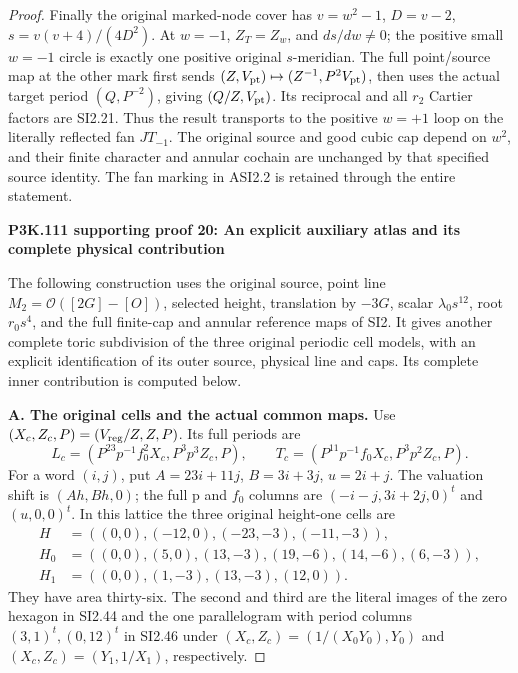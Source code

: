 \begin{proof}
Finally the original marked-node
cover has \(v=w^2-1\),
\(D=v-2\), \(s=v(v+4)/(4D^2)\).
At \(w=-1\), \(Z_T=Z_w\), and
\(ds/dw\ne0\); the positive small
\(w=-1\) circle is exactly one
positive original \(s\)-meridian.
The full point/source map at the
other mark first sends
\((Z,V_{\rm pt})\mapsto(Z^{-1},P^2V_{\rm pt})\),
then uses the actual target period
\((Q,P^{-2})\), giving
\((Q/Z,V_{\rm pt})\).
Its reciprocal and all \(r_2\)
Cartier factors are SI2.21.
Thus the result transports to the
positive \(w=+1\) loop on the
literally reflected fan \(JT_{-1}\).
The original source and good cubic
cap depend on \(w^2\), and their
finite character and annular
cochain are unchanged by that
specified source identity. The
fan marking in ASI2.2 is retained
through the entire statement.



\par\bigskip\noindent\textbf{P3K.111 supporting proof 20: An explicit auxiliary atlas and its complete physical contribution}\par\nobreak

The following construction uses the original source, point line
\(M_2=\mathcal O([2G]-[O])\), selected height, translation by \(-3G\),
scalar \(\lambda_0s^{12}\), root \(r_0s^4\), and the full finite-cap and
annular reference maps of SI2.  It gives another complete toric subdivision
of the three original periodic cell models, with an explicit identification
of its outer source, physical line and caps.  Its complete inner contribution
is computed below.

\medskip\noindent\textbf{A. The original cells and the actual common maps.}
Use \((X_c,Z_c,P)=(V_{\rm reg}/Z,Z,P)\).  Its full periods are
\[
 L_c=(P^{23}p^{-1}f_0^2X_c,P^3p^3Z_c,P),\qquad
 T_c=(P^{11}p^{-1}f_0X_c,P^3p^2Z_c,P).
\]
For a word \((i,j)\), put \(A=23i+11j\), \(B=3i+3j\),
\(u=2i+j\).  The valuation shift is \((Ah,Bh,0)\); the full p and
\(f_0\) columns are \((-i-j,3i+2j,0)^t\) and \((u,0,0)^t\).
In this lattice the three original height-one cells are
\[
\begin{split}
H&=((0,0),(-12,0),(-23,-3),(-11,-3)),\\
H_0&=((0,0),(5,0),(13,-3),(19,-6),(14,-6),(6,-3)),\\
H_1&=((0,0),(1,-3),(13,-3),(12,0)).
\end{split}
\]
They have area thirty-six.  The second and third are the literal images of
the zero hexagon in SI2.44 and the one parallelogram with period columns
\((3,1)^t,(0,12)^t\) in SI2.46 under
\((X_c,Z_c)=(1/(X_0Y_0),Y_0)\) and
\((X_c,Z_c)=(Y_1,1/X_1)\), respectively.


\end{proof}
